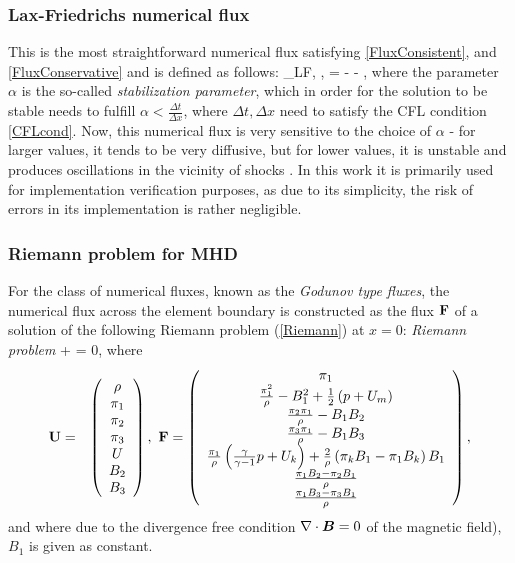 \subsubsection{Lax-Friedrichs numerical flux}
This is the most straightforward numerical flux satisfying \ref{FluxConsistent}, and \ref{FluxConservative} and is defined as follows:
\be
\mrH_{LF}\lo \mrv, \mrw, \bfn\ro = \left[\mrF\lo\mrv\ro + \mrF\lo\mrw\ro\right] - \lo \mrw - \mrv\ro,
\ee
where the parameter $\alpha$ is the so-called \textit{stabilization parameter}, which in order for the solution to be stable needs to fulfill $\alpha < \frac{\Delta t}{\Delta x}$, where $\Delta t, \Delta x$ need to satisfy the CFL condition \ref{CFLcond}. Now, this numerical flux is very sensitive to the choice of $\alpha$ - for larger values, it tends to be very diffusive, but for lower values, it is unstable and produces oscillations in the vicinity of shocks \cite{lfunstable}. In this work it is primarily used for implementation verification purposes, as due to its simplicity, the risk of errors in its implementation is rather negligible.

\subsubsection{Riemann problem for MHD}
For the class of numerical fluxes, known as the \textit{Godunov type fluxes}, the numerical flux across the element boundary is constructed as the flux $\mathrm{\mathbf{F}}$ of a solution of the following Riemann problem (\ref{Riemann}) at $x = 0$:
\textit{Riemann problem}
\be
\label{Riemann}
 +  = 0,
\ee
where
\begin{eqnarray}
\mathrm{\mathbf{U}} & = & \left(\begin{array}{c}\rho \\ \pi_1 \\ \pi_2 \\ \pi_3 \\ U \\ B_2 \\ B_3 \\ \end{array}\right),\ \mathrm{\mathbf{F}} = \left(\begin{array}{c} \pi_1 \\ \frac{\pi_1^2}{\rho} - B_1^2 + \frac12\left( p + U_m\right) \\ \frac{\pi_2 \pi_1}{\rho} - B_1 B_2 \\ \frac{\pi_3 \pi_1}{\rho} - B_1 B_3\\ \frac{\pi_1}{\rho} \left( \frac{\gamma}{\gamma - 1} p + U_k\right) + \frac{2}{\rho} \left( \pi_k B_1 - \pi_1 B_k\right) B_1  \\ \frac{\pi_1 B_2 - \pi_2 B_1}{\rho} \\ \frac{\pi_1 B_3 - \pi_3 B_1}{\rho} \\ \end{array}\right),
\end{eqnarray}
and where due to the divergence free condition $\nabla\cdot \mbox{\boldmath $B$} = 0$ of the magnetic field), $B_1$ is given as constant.
